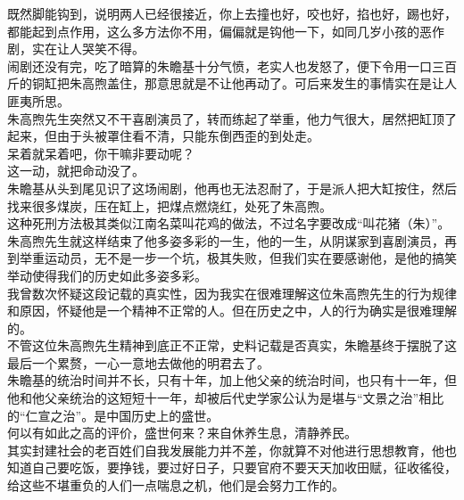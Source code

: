 \begin{multicols}{\theparacolNo}
既然脚能钩到，说明两人已经很接近，你上去撞也好，咬也好，掐也好，踢也好，都能起到点作用，这么多方法你不用，偏偏就是钩他一下，如同几岁小孩的恶作剧，实在让人哭笑不得。\\

闹剧还没有完，吃了暗算的朱瞻基十分气愤，老实人也发怒了，便下令用一口三百斤的铜缸把朱高煦盖住，那意思就是不让他再动了。可后来发生的事情实在是让人匪夷所思。\\

朱高煦先生突然又不干喜剧演员了，转而练起了举重，他力气很大，居然把缸顶了起来，但由于头被罩住看不清，只能东倒西歪的到处走。\\

呆着就呆着吧，你干嘛非要动呢？\\

这一动，就把命动没了。\\

朱瞻基从头到尾见识了这场闹剧，他再也无法忍耐了，于是派人把大缸按住，然后找来很多煤炭，压在缸上，把煤点燃烧红，处死了朱高煦。\\

这种死刑方法极其类似江南名菜叫花鸡的做法，不过名字要改成“叫花猪（朱）”。\\

朱高煦先生就这样结束了他多姿多彩的一生，他的一生，从阴谋家到喜剧演员，再到举重运动员，无不是一步一个坑，极其失败，但我们实在要感谢他，是他的搞笑举动使得我们的历史如此多姿多彩。\\

我曾数次怀疑这段记载的真实性，因为我实在很难理解这位朱高煦先生的行为规律和原因，怀疑他是一个精神不正常的人。但在历史之中，人的行为确实是很难理解的。\\

不管这位朱高煦先生精神到底正不正常，史料记载是否真实，朱瞻基终于摆脱了这最后一个累赘，一心一意地去做他的明君去了。\\

朱瞻基的统治时间并不长，只有十年，加上他父亲的统治时间，也只有十一年，但他和他父亲统治的这短短十一年，却被后代史学家公认为是堪与“文景之治”相比的“仁宣之治”。是中国历史上的盛世。\\

何以有如此之高的评价，盛世何来？来自休养生息，清静养民。\\

其实封建社会的老百姓们自我发展能力并不差，你就算不对他进行思想教育，他也知道自己要吃饭，要挣钱，要过好日子，只要官府不要天天加收田赋，征收徭役，给这些不堪重负的人们一点喘息之机，他们是会努力工作的。\\


\end{multicols}
